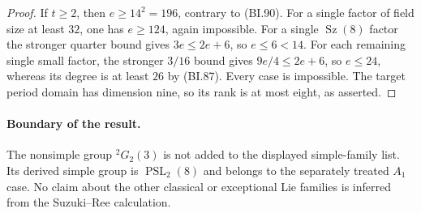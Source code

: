 \begin{proof}
If $t\ge2$, then $e\ge14^2=196$, contrary to (BI.90).
For a single factor of field size at least $32$, one has
$e\ge124$, again impossible.  For a single
$\operatorname{Sz}(8)$ factor the stronger quarter bound gives
$3e\le2e+6$, so $e\le6<14$.
For each remaining single small factor, the stronger $3/16$
bound gives $9e/4\le2e+6$, so $e\le24$, whereas its degree
is at least $26$ by (BI.87).  Every case is impossible.
The target period domain has dimension nine, so its rank is at
most eight, as asserted.
\end{proof}

\paragraph{Boundary of the result.}
The nonsimple group ${}^2G_2(3)$ is not added to the displayed
simple-family list.  Its derived simple group is
$\operatorname{PSL}_2(8)$ and belongs to the separately treated
$A_1$ case.  No claim about the other classical or exceptional
Lie families is inferred from the Suzuki--Ree calculation.
